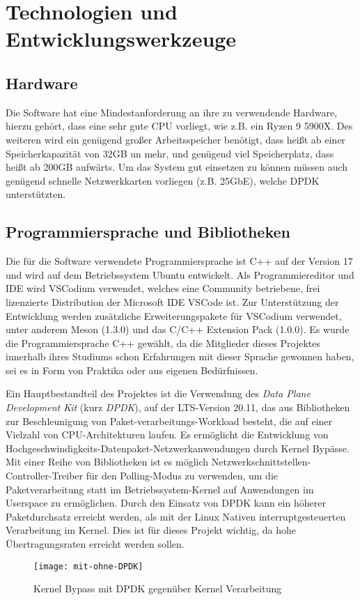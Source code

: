 \documentclass[../review_1.tex]{subfiles}
\begin{document}
\chapter{Technologien und Entwicklungswerkzeuge}\thispagestyle{fancy}

\section{Hardware}
Die Software hat eine Mindestanforderung an ihre zu verwendende Hardware, hierzu gehört, dass eine sehr gute CPU vorliegt, wie z.B. ein Ryzen 9 5900X. Des weiteren wird ein genügend großer Arbeitsspeicher benötigt, dass heißt ab einer Speicherkapazität von 32GB un mehr, und genügend viel Speicherplatz, dass heißt ab 200GB aufwärts. Um das System gut einsetzen zu können müssen auch genügend schnelle Netzwerkkarten vorliegen (z.B. 25GbE), welche DPDK unterstützten.

\section{Programmiersprache und Bibliotheken}
Die für die Software verwendete Programmiersprache ist C++ auf der Version 17 und wird auf dem Betriebssystem  Ubuntu entwickelt. Als Programmiereditor und IDE wird VSCodium verwendet, welches eine Community betriebene, frei lizenzierte Distribution der Microsoft IDE VSCode ist. Zur Unterstützung der Entwicklung werden zusätzliche  Erweiterungspakete für VSCodium verwendet, unter anderem Meson (1.3.0) und das C/C++ Extension Pack (1.0.0).
Es wurde die Programmiersprache C++ gewählt, da die Mitglieder dieses Projektes innerhalb ihres Studiums schon Erfahrungen mit dieser Sprache gewonnen haben, sei es in Form von Praktika oder aus eigenen Bedürfnissen.

Ein Hauptbestandteil des Projektes ist die Verwendung des \textit{Data Plane Development Kit} (kurz \textit{DPDK}), auf der LTS-Version 20.11, das aus Bibliotheken zur Beschleunigung von Paket-verarbeitungs-Workload besteht, die auf einer Vielzahl von CPU-Architekturen laufen. Es ermöglicht die Entwicklung von Hochgeschwindigkeits-Datenpaket-Netzwerkanwendungen durch Kernel Bypässe. Mit einer Reihe von Bibliotheken ist es möglich Netzwerkschnittstellen-Controller-Treiber für den Polling-Modus zu verwenden, um die Paketverarbeitung statt im Betriebssystem-Kernel auf Anwendungen im Userspace zu ermöglichen. Durch den Einsatz von DPDK kann ein höherer Paketdurchsatz erreicht werden, als mit der Linux Nativen interruptgesteuerten Verarbeitung im Kernel. Dies ist für dieses Projekt wichtig, da hohe Übertragungsraten erreicht werden sollen.
\begin{figure}[H]
    \centering
    \texttt{[image: mit-ohne-DPDK]}
    \caption{Kernel Bypass mit DPDK gegenüber Kernel Verarbeitung}
    \label{fig:with_without_dpdk}
\end{figure}
\end{document}
